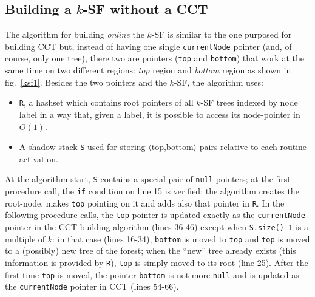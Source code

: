 \documentclass[a4paper,10pt]{report}
\begin{document}
\subsection{Building a $k$-SF without a CCT}

The algorithm for building \emph{online} the $k$-SF is similar to the one purposed for building CCT but, instead of having 
one single \verb|currentNode| pointer (and, of course, only one tree), there two are pointers (\verb|top| and \verb|bottom|) that work at the same time on two different regions: \emph{top} region and \emph{bottom} region as shown in fig.~\ref{ksf1}.
Besides the two pointers and the $k$-SF, the algorithm uses:

\begin{itemize}
\item \verb|R|, a hashset which contains root pointers of all $k$-SF trees indexed by node label in a way that, given a label, it is possible to access its node-pointer in $O(1)$.

\item A shadow stack \verb|S| used for storing $\langle$top,bottom$\rangle$ pairs relative to each routine activation. 
\end{itemize}

At the algorithm start, \verb|S| contains a special pair of \verb|null| pointers; 
at the first procedure call, the \verb|if| condition on line 15 is verified:
the algorithm creates the root-node, makes \verb|top| pointing on it and adds also that pointer in \verb|R|. In the following procedure calls, the \verb|top| pointer is updated exactly as the \verb|currentNode| pointer in the CCT building algorithm (lines 36-46) except when \verb|S.size()-1| is a multiple of $k$: in that case (lines 16-34), \verb|bottom| is moved to \verb|top| and \verb|top| is moved to a (possibly) new tree of the forest; when the ``new'' tree already exists (this information is provided by \verb|R|), \verb|top| is simply moved to its root (line 25). After the first time \verb|top| is moved, the pointer \verb|bottom| is not more \verb|null| and is updated as the \verb|currentNode| pointer in CCT (lines 54-66). 
\end{document}
